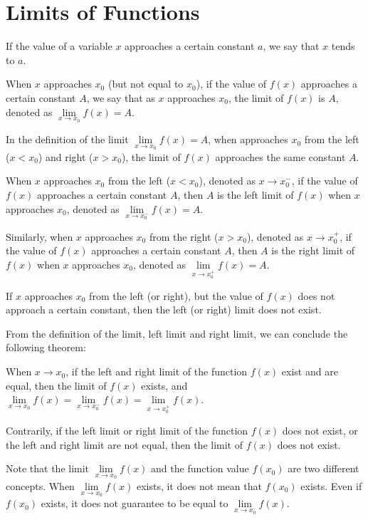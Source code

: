 \documentclass[12pt]{report}
\begin{document}
\section{Limits of Functions}

If the value of a variable $x$ approaches a certain constant $a$, we say that
$x$ tends to $a$.

When $x$ approaches $x_0$ (but not equal to $x_0$), if the value of $f(x)$
approaches a certain constant $A$, we say that as $x$ approaches $x_0$, the
limit of $f(x)$ is $A$, denoted as $\lim\limits_{x \to x_0} f(x) = A$.

In the definition of the limit $\lim\limits_{x \to x_0} f(x) = A$, when
approaches $x_0$ from the left ($x < x_0$) and right ($x > x_0$), the limit of
$f(x)$ approaches the same constant $A$.

When $x$ approaches $x_0$ from the left ($x < x_0$), denoted as $x \to x_0^-$,
if the value of $f(x)$ approaches a certain constant $A$, then $A$ is the left
limit of $f(x)$ when $x$ approaches $x_0$, denoted as $\lim\limits_{x \to
    x_0^-} f(x) = A$.

Similarly, when $x$ approaches $x_0$ from the right ($x > x_0$), denoted as $x
  \to x_0^+$, if the value of $f(x)$ approaches a certain constant $A$, then $A$
is the right limit of $f(x)$ when $x$ approaches $x_0$, denoted as
$\lim\limits_{x \to x_0^+} f(x) = A$.

If $x$ approaches $x_0$ from the left (or right), but the value of $f(x)$ does
not approach a certain constant, then the left (or right) limit does not exist.

From the definition of the limit, left limit and right limit, we can conclude
the following theorem:
\begin{mdframed}[style=MyFrame]
  When $x \to x_0$, if the left and right limit of the function $f(x)$ exist and are equal, then the limit of $f(x)$ exists, and $\lim\limits_{x \to x_0} f(x) = \lim\limits_{x \to x_0^-} f(x) = \lim\limits_{x \to x_0^+} f(x)$.

  Contrarily, if the left limit or right limit of the function $f(x)$ does not
  exist, or the left and right limit are not equal, then the limit of $f(x)$ does
  not exist.
\end{mdframed}

Note that the limit $\lim\limits_{x \to x_0} f(x)$ and the function value
$f(x_0)$ are two different concepts. When $\lim\limits_{x \to x_0} f(x)$
exists, it does not mean that $f(x_0)$ exists. Even if $f(x_0)$ exists, it does
not guarantee to be equal to $\lim\limits_{x \to x_0} f(x)$.
\end{document}
